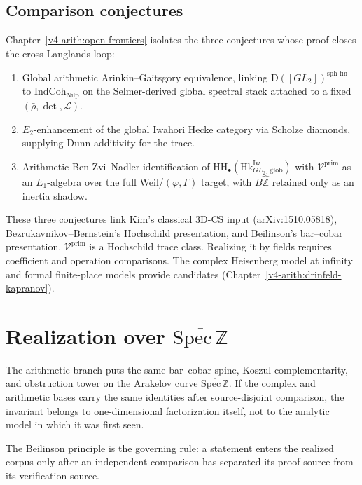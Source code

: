 \subsection*{Comparison conjectures}

Chapter~\ref{v4-arith:open-frontiers} isolates the three
conjectures whose proof closes the cross-Langlands loop:

\begin{enumerate}
\item Global arithmetic Arinkin--Gaitsgory equivalence, linking
\(\mathrm{D}([GL_{2}])^{\mathrm{sph\text{-}fin}}\) to
\(\mathrm{IndCoh}_{\mathrm{Nilp}}\) on the Selmer-derived global
spectral stack attached to a fixed \((\bar\rho,\det,\mathcal{L})\).
\item \(E_{2}\)-enhancement of the global Iwahori Hecke category via
Scholze diamonds, supplying Dunn additivity for the trace.
\item Arithmetic Ben-Zvi--Nadler identification of
\(\mathrm{HH}_{\bullet}(\mathrm{Hk}^{\mathrm{Iw}}_{GL_{2},\,\mathrm{glob}})\)
with \(\mathcal{V}^{\mathrm{prim}}\) as an \(E_{1}\)-algebra over the
full Weil/\((\varphi,\Gamma)\) target, with \(B\widehat{\mathbb{Z}}\)
retained only as an inertia shadow.
\end{enumerate}

These three conjectures link Kim's classical 3D-CS input
(arXiv:1510.05818), Bezrukavnikov--Bernstein's Hochschild
presentation, and Beilinson's bar--cobar presentation.
\(\mathcal{V}^{\mathrm{prim}}\) is a Hochschild trace class.
Realizing it by fields requires coefficient and operation comparisons.
The complex Heisenberg model at infinity and formal finite-place
models provide candidates (Chapter~\ref{v4-arith:drinfeld-kapranov}).

\section{Realization over \texorpdfstring{\(\overline{\mathrm{Spec}\,\mathbb{Z}}\)}{Spec Z bar}}
\label{v4-arith:manifesto:role}

The arithmetic branch puts the same bar--cobar spine, Koszul
complementarity, and obstruction tower on the Arakelov curve
\(\overline{\mathrm{Spec}\,\mathbb{Z}}\). If the complex and
arithmetic bases carry the same identities after source-disjoint
comparison, the invariant belongs to one-dimensional factorization
itself, not to the analytic model in which it was first seen.

The Beilinson principle is the governing rule: a statement enters the
realized corpus only after an independent comparison has separated its
proof source from its verification source.

